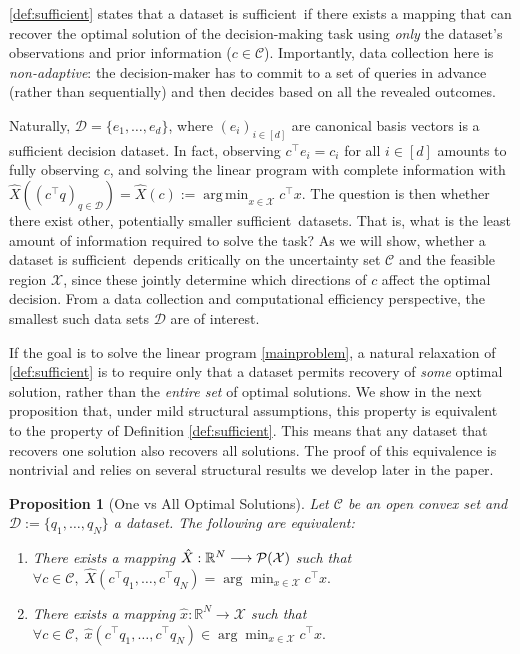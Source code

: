 \documentclass[11pt]{article}
\theoremstyle{plain}
\newtheorem{proposition}{Proposition}
\theoremstyle{definition}
\newcommand{\R}[0]{\mathbb R}
\newcommand{\sufficient}{sufficient decision dataset}
\newcommand{\suff}{sufficient}
\newcommand{\cX}{\mathcal{X}}
\newcommand{\cC}{\mathcal{C}}
\newcommand{\cD}{\mathcal{D}}
\DeclareMathOperator*{\argmin}{arg\,min}
\begin{document}
\cref{def:sufficient} states that a dataset is \suff\ if there exists a mapping that can recover the optimal solution of the decision-making task using \textit{only} the dataset’s observations and prior information ($c \in \cC$). 
 Importantly, data collection here is \textit{non-adaptive}: the decision-maker has to commit to a set of queries in advance (rather than sequentially) and then decides based on all the revealed outcomes.

Naturally, $\cD = \{e_1,\ldots,e_d\}$, where $(e_i)_{i\in [d]}$ are canonical basis vectors is a \sufficient. In fact, observing $c^\top e_i = c_i$ for all $i \in [d]$ amounts to fully observing $c$, and solving the linear program with complete information with $\hat{X}((c^\top q)_{q \in \cD}) = \hat{X}(c) := \argmin_{x \in \cX} c^\top x$. The question is then whether there exist other, potentially smaller \suff\ datasets. That is, what is the least amount of information required to solve the task? As we will show, whether a dataset is \suff\ depends critically on the uncertainty set $\cC$ and the feasible region $\cX$, since these jointly determine which directions of $c$ affect the optimal decision. From a data collection and computational efficiency perspective, the smallest such data sets $\cD$ are of interest.


If the goal is to solve the linear program \eqref{mainproblem}, 
a natural relaxation of \cref{def:sufficient} is to require only that a dataset permits recovery of \textit{some} optimal solution, rather than the \textit{entire set} of optimal solutions.
We show in the next proposition that, under mild structural assumptions, this property is equivalent to the property of Definition \ref{def:sufficient}. This means that any dataset that recovers one solution also recovers all solutions. The proof of this equivalence is nontrivial and relies on several structural results we develop later in the paper.

\begin{proposition}[One vs All Optimal Solutions] \label{prop:equivalence-argmin}
        Let $\cC$ be an open convex set and $\cD:=\{q_1,\dots,q_N\}$ a dataset. The following are equivalent:
        \begin{enumerate}
            \item \label{item:fullargmin} There exists a mapping $\hat X:\R^{N} \longrightarrow\cal P(\cX)$ such that
            \(
                \forall c \in \cC, \; \hat X\left(c^\top q_1,\dots,c^\top q_N\right)=\arg\min_{x\in \cX}c^\top x.
            \)

            \item \label{item:singlesol} There exists a mapping $\hat{x}:\R^N\longrightarrow \cX$ such that
                \(
                    \forall c\in \cC,\; \hat{x}\left(c^\top q_1,\dots,c^\top q_N\right)\in \arg\min_{x\in \cX}c^\top x. \label{condition for suff}
                \)
        \end{enumerate}
    
    \end{proposition}
\end{document}
